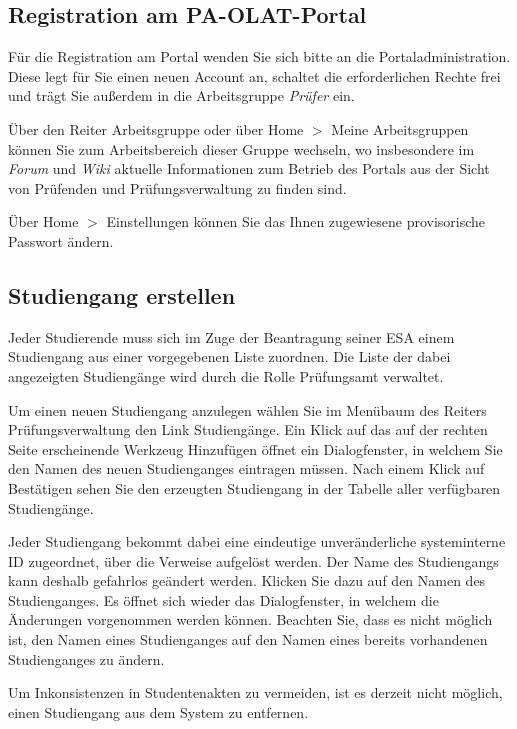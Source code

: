 \documentclass[a4paper,11pt]{article}
\newcommand{\knopf}[1]{{\sc #1}}
\begin{document}
\subsection{Registration am PA-OLAT-Portal}

Für die Registration am Portal wenden Sie sich bitte an die
Portaladministration.  Diese legt für Sie einen neuen Account an, schaltet die
erforderlichen Rechte frei und trägt Sie außerdem in die Arbeitsgruppe {\em
  Prüfer} ein.

Über den Reiter \knopf{Arbeitsgruppe} oder über \knopf{Home $>$ Meine
  Arbeitsgruppen} können Sie zum Arbeitsbereich dieser Gruppe wechseln, wo
insbesondere im {\em Forum} und {\em Wiki} aktuelle Informationen zum Betrieb
des Portals aus der Sicht von Prüfenden und Prüfungsverwaltung zu finden sind.

Über \knopf{Home $>$ Einstellungen} können Sie das Ihnen zugewiesene
provisorische Passwort ändern.

\subsection{Studiengang erstellen}

Jeder Studierende muss sich im Zuge der Beantragung seiner ESA einem Studiengang
aus einer vorgegebenen Liste zuordnen.  Die Liste der dabei angezeigten
Studiengänge wird durch die Rolle Prüfungsamt verwaltet. 

Um einen neuen Studiengang anzulegen wählen Sie im Menübaum des Reiters
\knopf{Prüfungsverwaltung} den Link \knopf{Studiengänge}. Ein Klick auf das
auf der rechten Seite erscheinende Werkzeug \knopf{Hinzufügen} öffnet ein
Dialogfenster, in welchem Sie den Namen des neuen Studienganges eintragen
müssen.  Nach einem Klick auf \knopf{Bestätigen} sehen Sie den erzeugten
Studiengang in der Tabelle aller verfügbaren Studiengänge.

Jeder Studiengang bekommt dabei eine eindeutige unveränderliche systeminterne
ID zugeordnet, über die Verweise aufgelöst werden. Der Name des Studiengangs
kann deshalb gefahrlos geändert werden. Klicken Sie dazu auf den Namen des
Studienganges. Es öffnet sich wieder das Dialogfenster, in welchem die
Änderungen vorgenommen werden können. Beachten Sie, dass es nicht möglich ist,
den Namen eines Studienganges auf den Namen eines bereits vorhandenen
Studienganges zu ändern.  

Um Inkonsistenzen in Studentenakten zu vermeiden, ist es derzeit nicht
möglich, einen Studiengang aus dem System zu entfernen.
\end{document}
